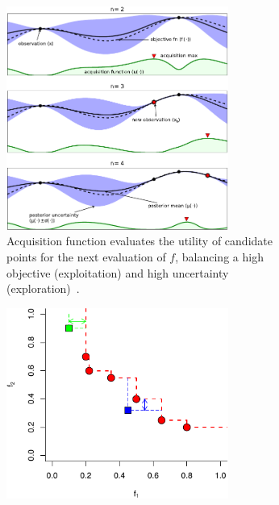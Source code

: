 \begin{figure}
  \begin{subfigure}{0.55\textwidth}
    \centering
    \includegraphics[width=0.8\textwidth]{figures/serving-bo-illustration.pdf}
    \caption{Acquisition function evaluates the utility of candidate points for
      the next evaluation of $f$, balancing a high objective (exploitation) and
      high uncertainty (exploration)~\cite{shahriari2016taking}.}
  \end{subfigure}
  \hfill
  \begin{subfigure}{0.40\textwidth}
    \centering
    \includegraphics[width=0.8\textwidth]{figures/serving-bo-2d-1.pdf} \\

\end{subfigure}
\end{figure}
